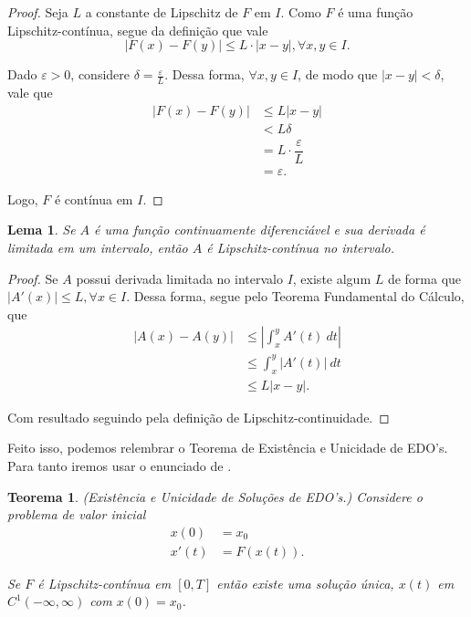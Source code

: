 \documentclass{article}
\newtheorem{theorem}{Teorema}
\newtheorem{lemma}{Lema}
\begin{document}
\begin{proof}
    Seja $L$ a constante de Lipschitz de $F$ em $I$. Como $F$ é uma função Lipschitz-contínua, segue da definição que vale
    \[|F(x) - F(y)|\leq L\cdot |x - y|, \forall x, y\in I.\]
    
    Dado $\varepsilon > 0$, considere $\delta = \frac{\varepsilon}{L}$. Dessa forma, $\forall x, y\in I$, de modo que $|x - y| < \delta$, vale que
    \begin{equation*}
        \begin{split}
            |F(x) - F(y)| & \leq L|x - y| \\
            & < L\delta \\
            & = L\cdot \dfrac{\varepsilon}{L} \\
            & = \varepsilon.
        \end{split}
    \end{equation*}
    
    Logo, $F$ é contínua em $I$.
\end{proof}

\begin{lemma}
    \label{lipschitz-continua}
    Se $A$ é uma função continuamente diferenciável e sua derivada é limitada em um intervalo, então $A$ é Lipschitz-contínua no intervalo.
\end{lemma}

\begin{proof}
    Se $A$ possui derivada limitada no intervalo $I$, existe algum $L$ de forma que $|A'(x)|\leq L, \forall x\in I$. Dessa forma, segue pelo Teorema Fundamental do Cálculo, que
    \begin{equation*}
        \begin{split}
            \left|A(x) - A(y)\right| & \leq \left|\int_x^y A'(t) ~dt\right| \\
            & \leq \int_x^y \left|A'(t)\right| ~dt \\
            & \leq L \left|x - y\right|.
        \end{split}
    \end{equation*}
    
    Com resultado seguindo pela definição de Lipschitz-continuidade.
\end{proof}

Feito isso, podemos relembrar o Teorema de Existência e Unicidade de EDO's. Para tanto iremos usar o enunciado de \cite{cruz}.

\begin{theorem}(Existência e Unicidade de Soluções de EDO's.)
    \label{existencia_e_unicidade}
    Considere o problema de valor inicial
    \begin{equation*}
        \begin{split}
            x(0) & = x_0 \\
            x'(t) & = F(x(t)).
        \end{split}
    \end{equation*}
    
    Se $F$ é Lipschitz-contínua em $[0, T]$ então existe uma solução única, $x(t)$ em $C^1(-\infty, \infty)$ com $x(0) = x_0$.
\end{theorem}
\end{document}
